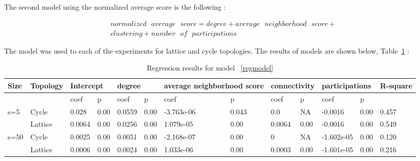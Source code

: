 The second model using the normalized average score is the following :

\begin{equation}\label{regmodel}
\begin{split}
normalized\textrm{ }average\textrm{ }score = degree + average\textrm{ }neighborhood\textrm{ }score + \\
clustering + number\textrm{ }of\textrm{ }participations
\end{split}
\end{equation}

The model was used to each of the experiments for lattice and cycle topologies.
The results of models are shown below, Table~\ref{regression} :

\begin{table}[!hbtp]
\centering
\begin{adjustbox}{width=1\textwidth}
\small
\begin{tabular}{@{}|l|l|l|l|l|l|l|l|l|l|l|l|l|@{}}
\toprule
Size & Topology & \multicolumn{2}{l|}{Intercept} & \multicolumn{2}{l|}{degree} & \multicolumn{2}{l|}{average neighborhood score} & \multicolumn{2}{l|}{connectivity} & \multicolumn{2}{l|}{participations} & R-square \\ \midrule
     &          & coef            & p            & coef          & p           & coef                      & p                    & coef             & p              & coef                & p             &          \\ \midrule
s=5  & Cycle    & 0.028           & 0.00         & 0.0559        & 0.00        & -3.763e-06                & 0.043                & 0.0              & NA             & -0.0016             & 0.00          & 0.457    \\ \midrule
     & Lattice  & 0.0064          & 0.00         & 0.0256        & 0.00        & 1.079e-05                 & 0.00                 & 0.0064           & 0.00           & -0.0016             & 0.00          & 0.549    \\ \midrule
s=50 & Cycle    & 0.0025          & 0.00         & 0.0051        & 0.00        & -2.168e-07                & 0.00                 & 0                & NA             & -1.602e-05          & 0.00          & 0.120    \\ \midrule
     & Lattice  & 0.0006          & 0.00         & 0.0024        & 0.00        & 1.033e-06                 & 0.00                 & 0.0003           & 0.00           & -1.601e-05          & 0.00          & 0.216    \\ \bottomrule
\end{tabular}
\end{adjustbox}
\caption{Regression results for model ~\ref{regmodel}}
\label{regression}
\end{table}


